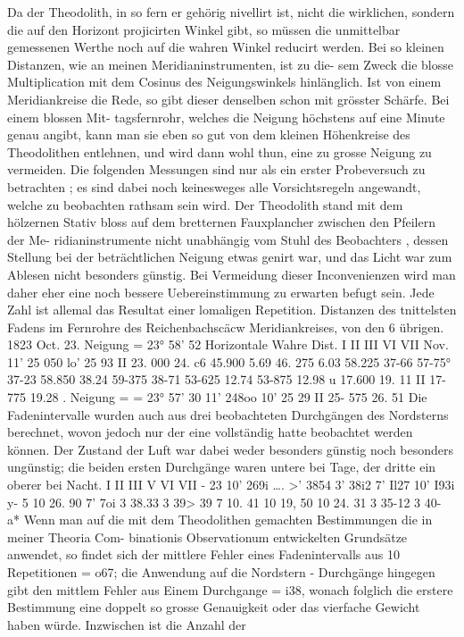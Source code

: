 \documentclass[10pt,a4paper]{article}
\begin{document}
Da  der  Theodolith,  in  so  fern  er  gehörig  nivellirt  ist,  nicht  die  wirklichen,  sondern  die  auf  den
Horizont  projicirten  Winkel  gibt,  so  müssen  die  unmittelbar  gemessenen  Werthe  noch  auf  die  wahren
Winkel  reducirt  werden.  Bei  so  kleinen  Distanzen,  wie  an  meinen  Meridianinstrumenten,  ist  zu  die-
sem Zweck  die  blosse  Multiplication  mit  dem  Cosinus  des  Neigungswinkels  hinlänglich.  Ist  von  einem
Meridiankreise  die  Rede,  so  gibt  dieser  denselben  schon  mit  grösster  Schärfe.  Bei  einem  blossen  Mit-
tagsfernrohr, welches  die  Neigung  höchstens  auf  eine  Minute  genau  angibt,  kann  man  sie  eben  so  gut
von  dem  kleinen  Höhenkreise  des  Theodolithen  entlehnen,  und  wird  dann  wohl  thun,  eine  zu  grosse
Neigung  zu  vermeiden.
Die  folgenden  Messungen  sind  nur  als  ein  erster  Probeversuch  zu  betrachten ;  es  sind  dabei  noch
keinesweges  alle  Vorsichtsregeln  angewandt,  welche  zu  beobachten  rathsam  sein  wird.  Der  Theodolith
stand  mit  dem  hölzernen  Stativ  bloss  auf  dem  bretternen  Fauxplancher  zwischen  den  Pfeilern  der  Me-
ridianinstrumente nicht  unabhängig  vom  Stuhl  des  Beobachters ,  dessen  Stellung  bei  der  beträchtlichen
Neigung  etwas  genirt  war,  und  das  Licht  war  zum  Ablesen  nicht  besonders  günstig.  Bei  Vermeidung
dieser  Inconvenienzen  wird  man  daher  eher  eine  noch  bessere  Uebereinstimmung  zu  erwarten  befugt
sein.     Jede  Zahl  ist  allemal  das  Resultat  einer  lomaligen  Repetition.
Distanzen  des  tnittelsten  Fadens  im  Fernrohre  des  Reichenbachscäcw  Meridiankreises,  von  den  6  übrigen.
1823  Oct.  23.    Neigung     =  23°  58'  52\glqq{}
Horizontale      Wahre  Dist.
I
II
III
VI
VII
Nov.
11'
25 \glqq{}050
lo'
25  \glqq{}93
II
23. 000
24.  c6
45.900
5.69
46.  275
6.03
58.225
37-66
57-75°
37-23
58.850
38.24
59-375
38-71
53-625
12.74
53-875
12.98
u
17.600
19. 11
II
17-  775
19.28
.     Neigung     =
=  23°
57'  30\glqq{}
11'
24\glqq{}8oo
10'
25  \glqq{}29
II
25-  575
26.  51
Die  Fadenintervalle  wurden  auch  aus  drei  beobachteten  Durchgängen  des  Nordsterns  berechnet,
wovon  jedoch  nur  der  eine  vollständig  hatte  beobachtet  werden  können.  Der  Zustand  der  Luft  war
dabei  weder  besonders  günstig  noch  besonders  ungünstig;  die  beiden  ersten  Durchgänge  waren  untere
bei  Tage,  der  dritte  ein  oberer  bei  Nacht.
I
II
III
V
VI
VII
-  23
10'    26\glqq{}9i
\dots{}.
>'    38\glqq{}54
3'    38\glqq{}i2
7'      Il\glqq{}27
10'    I9\glqq{}3i
y-     5
10     26. 90
7'    7\glqq{}oi
3     38.33
3     39>  39
7     10. 41
10     19, 50
10     24. 31
3     35-12
3     40-  a*
Wenn  man  auf  die  mit  dem  Theodolithen  gemachten  Bestimmungen  die  in  meiner  Theoria  Com-
binationis  Observationum  entwickelten  Grundsätze  anwendet,  so  findet  sich  der  mittlere  Fehler  eines
Fadenintervalls  aus  10  Repetitionen  =  o\glqq{}67;  die  Anwendung  auf  die  Nordstern  -  Durchgänge  hingegen
gibt  den  mittlem  Fehler  aus  Einem  Durchgange  =  i\glqq{}38,  wonach  folglich  die  erstere  Bestimmung  eine
doppelt  so  grosse  Genauigkeit  oder  das  vierfache  Gewicht  haben  würde.     Inzwischen  ist  die  Anzahl  der
\end{document}
